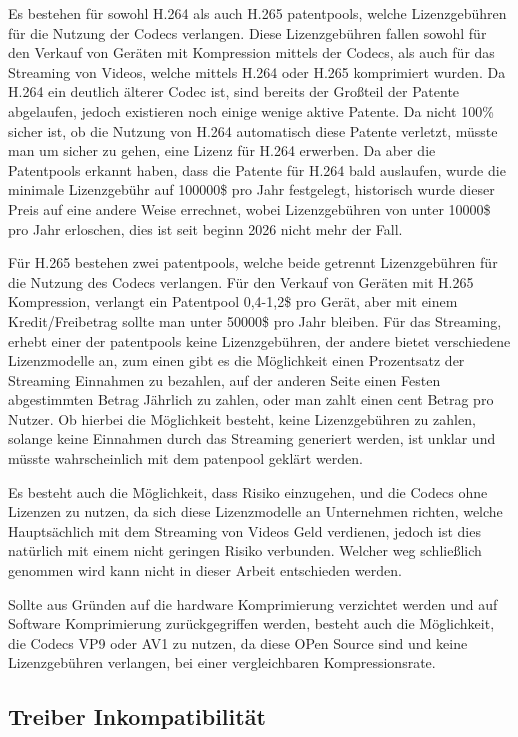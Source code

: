Es bestehen für sowohl H.264 als auch H.265 patentpools, welche Lizenzgebühren für die Nutzung der Codecs verlangen. Diese Lizenzgebühren fallen sowohl für den Verkauf von Geräten mit Kompression mittels der Codecs, als auch für das Streaming von Videos, welche mittels H.264 oder H.265 komprimiert wurden.
Da H.264 ein deutlich älterer Codec ist, sind bereits der Großteil der Patente abgelaufen, jedoch existieren noch einige wenige aktive Patente. Da nicht 100\% sicher ist, ob die Nutzung von H.264 automatisch diese Patente verletzt, müsste man um sicher zu gehen, eine Lizenz für H.264 erwerben. 
Da aber die Patentpools erkannt haben, dass die Patente für H.264 bald auslaufen, wurde die minimale Lizenzgebühr auf 100000\$ pro Jahr festgelegt, historisch wurde dieser Preis auf eine andere Weise errechnet, wobei Lizenzgebühren von unter 10000\$ pro Jahr erloschen, 
dies ist seit beginn 2026 nicht mehr der Fall.

Für H.265 bestehen zwei patentpools, welche beide getrennt Lizenzgebühren für die Nutzung des Codecs verlangen. Für den Verkauf von Geräten mit H.265 Kompression, verlangt ein Patentpool 0,4-1,2\$ pro Gerät, aber mit einem Kredit/Freibetrag sollte man unter 50000\$ pro Jahr bleiben. Für das Streaming,
erhebt einer der patentpools keine Lizenzgebühren, der andere bietet verschiedene Lizenzmodelle an, zum einen gibt es die Möglichkeit einen Prozentsatz der Streaming Einnahmen zu bezahlen, auf der anderen Seite einen Festen abgestimmten Betrag Jährlich zu zahlen, oder man zahlt einen cent Betrag pro Nutzer.
Ob hierbei die Möglichkeit besteht, keine Lizenzgebühren zu zahlen, solange keine Einnahmen durch das Streaming generiert werden, ist unklar und müsste wahrscheinlich mit dem patenpool geklärt werden.

Es besteht auch die Möglichkeit, dass Risiko einzugehen, und die Codecs ohne Lizenzen zu nutzen, da sich diese Lizenzmodelle an Unternehmen richten, welche Hauptsächlich mit dem Streaming von Videos Geld verdienen, jedoch ist dies natürlich mit einem nicht geringen Risiko verbunden. Welcher weg schließlich
genommen wird kann nicht in dieser Arbeit entschieden werden.

Sollte aus Gründen auf die hardware Komprimierung verzichtet werden und auf Software Komprimierung zurückgegriffen werden, besteht auch die Möglichkeit, die Codecs VP9 oder AV1 zu nutzen, da diese OPen Source sind und keine Lizenzgebühren verlangen, bei einer vergleichbaren Kompressionsrate.

\subsection{Treiber Inkompatibilität}

